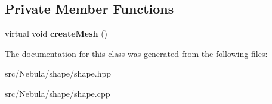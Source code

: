 \subsection*{\-Private \-Member \-Functions}
\begin{DoxyCompactItemize}
\item 
\hypertarget{classNeb_1_1Shape_1_1Box_1_1Box_a03026c27dd9898c1b1a4ac7103cd834d}{virtual void {\bfseries create\-Mesh} ()}\label{classNeb_1_1Shape_1_1Box_1_1Box_a03026c27dd9898c1b1a4ac7103cd834d}

\end{DoxyCompactItemize}


\-The documentation for this class was generated from the following files\-:\begin{DoxyCompactItemize}
\item 
src/\-Nebula/shape/shape.\-hpp\item 
src/\-Nebula/shape/shape.\-cpp\end{DoxyCompactItemize}
